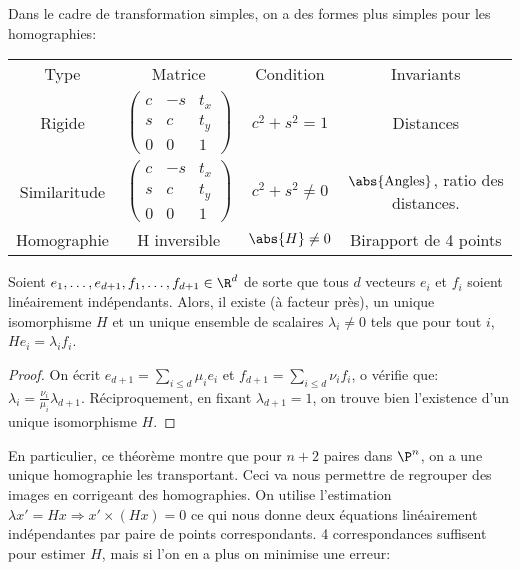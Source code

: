 \documentclass[info, math]{mpb-cours}
\begin{document}
Dans le cadre de transformation simples, on a des formes plus simples pour les homographies:
\begin{center}
	\begin{tabular}{cccc}
		Type         & Matrice                                      & Condition              & Invariants            \\
		Rigide       & $\begin{pmatrix}
				                c & -s & t_{x} \\ s & c & t_{y} \\ 0 & 0 & 1
			                \end{pmatrix}$ & $c^{2} + s^{2} = 1$    & Distances                                          \\
		Similaritude & $ \begin{pmatrix}
				                 c & -s & t_{x} \\ s & c & t_{y} \\ 0 & 0 & 1
			                 \end{pmatrix}$ & $c^{2} + s^{2} \neq 0$ & $\abs{\text{Angles}}$, ratio des distances.       \\
		Homographie  & H inversible                                 & $\abs{H} \neq 0$       & Birapport de 4 points
	\end{tabular}
\end{center}

\begin{thm}
	Soient $e_{1}, \ldots, e_{d + 1}, f_{1}, \ldots, f_{d + 1} \in \R^{d}$ de sorte que tous $d$ vecteurs $e_{i}$ et $f_{i}$ soient linéairement indépendants.
	Alors, il existe (à facteur près), un unique isomorphisme $H$ et un unique ensemble de scalaires $\lambda_{i} \neq 0$ tels que pour tout $i$, $He_{i} = \lambda_{i} f_{i}$.
\end{thm}
\begin{proof}
	On écrit $e_{d + 1} = \sum_{i \leq d} \mu_{i} e_{i}$ et $f_{d + 1} = \sum_{i \leq d} \nu_{i}f_{i}$, o vérifie que:
	$\lambda_{i} = \frac{\nu_{i}}{\mu_{i}}\lambda_{d + 1}$.
	Réciproquement, en fixant $\lambda_{d + 1} = 1$, on trouve bien l'existence d'un unique isomorphisme $H$.
\end{proof}

En particulier, ce théorème montre que pour $n + 2$ paires dans $\P^{n}$, on a une unique homographie les transportant.
Ceci va nous permettre de regrouper des images en corrigeant des homographies.
On utilise l'estimation $\lambda x' = Hx \Rightarrow x' \times (Hx) = 0$ ce qui nous donne deux équations linéairement indépendantes par paire de points correspondants.
4 correspondances suffisent pour estimer $H$, mais si l'on en a plus on minimise une erreur:
\end{document}
